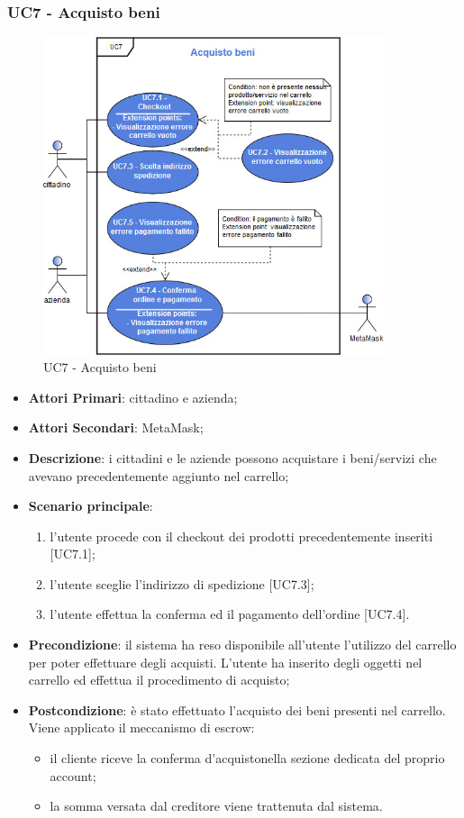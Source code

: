 \subsubsection{UC7 - Acquisto beni}
\begin{figure}[h]
	\includegraphics[width=10cm]{res/images/UC7OK.jpg}
	\centering
	\caption{UC7 - Acquisto beni}
\end{figure}
\begin{itemize}
	\item \textbf{Attori Primari}: cittadino e azienda;
	\item \textbf{Attori Secondari}: MetaMask\glo;
	\item \textbf{Descrizione}: i cittadini e le aziende possono acquistare i beni/servizi che avevano precedentemente aggiunto nel carrello;
	\item \textbf{Scenario principale}: 
	\begin{enumerate}[label=\alph*.]
		\item l'utente procede con il checkout dei prodotti precedentemente inseriti [UC7.1];
		\item l'utente sceglie l'indirizzo di spedizione [UC7.3];
		\item l'utente effettua la conferma ed il pagamento dell'ordine [UC7.4].
	\end{enumerate}
	
	\item \textbf{Precondizione}: il sistema ha reso disponibile all'utente l'utilizzo del carrello per poter effettuare degli acquisti. L'utente ha inserito degli oggetti nel carrello ed effettua il procedimento di acquisto;
	\item \textbf{Postcondizione}: è stato effettuato l'acquisto dei beni presenti nel carrello. Viene applicato il meccanismo di escrow\glo: 
	\begin{itemize}
		\item il cliente riceve la conferma d'acquisto\glosp nella sezione dedicata del proprio account;
		\item la somma versata dal creditore viene trattenuta dal sistema.
	\end{itemize} 
\end{itemize} 
